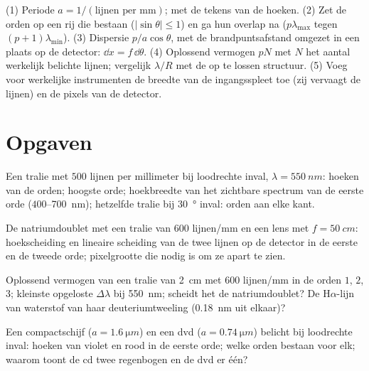 \begin{method}[Tralieberekeningen]\label{met:b2:gratings:method}
(1) Periode $a = 1/(\text{lijnen per mm})$;  met de
tekens van de hoeken. (2) Zet de orden op een rij die bestaan ($|\sin\theta| \le 1$)
en ga hun overlap na ($p\lambda_{\max}$ tegen $(p + 1)\lambda_{\min}$). (3)
Dispersie $p/a\cos\theta$, met de brandpuntsafstand omgezet in een plaats op
de detector:
$\dd x = f\,\dd\theta$. (4) Oplossend vermogen $pN$ met $N$ het aantal
werkelijk belichte lijnen; vergelijk $\lambda/R$ met de op te lossen structuur.
(5) Voeg voor werkelijke instrumenten de breedte van de ingangsspleet toe (zij
vervaagt de lijnen) en de pixels van de detector.
\end{method}

\section{Opgaven}

\begin{exercise}[$\star$]\label{exo:b2:gratings:1}
Een tralie met $500$ lijnen per millimeter bij loodrechte inval,
$\lambda =
\qty{550}{nm}$: hoeken van de orden; hoogste orde; hoekbreedte
van het
zichtbare spectrum van de eerste orde ($400$--\qty{700}{nm}); hetzelfde tralie bij
\qty{30}{\degree} inval: orden aan elke kant.
\end{exercise}

\begin{exercise}[$\star$]\label{exo:b2:gratings:2}
De natriumdoublet met een tralie van $600$ lijnen/mm en een lens met
$f =
\qty{50}{cm}$: hoekscheiding en lineaire scheiding van de twee lijnen
op de
detector in de eerste en de tweede orde; pixelgrootte die nodig is om ze
apart te zien.
\end{exercise}

\begin{exercise}[$\star$]\label{exo:b2:gratings:3}
Oplossend vermogen van een tralie van \qty{2}{cm} met $600$ lijnen/mm in de
orden $1$, $2$,
$3$; kleinste opgeloste $\Delta\lambda$ bij \qty{550}{nm}; scheidt het de
natriumdoublet?
De H$\alpha$-lijn van waterstof van haar deuteriumtweeling (\qty{0.18}{nm}
uit elkaar)?
\end{exercise}

\begin{exercise}[$\star$]\label{exo:b2:gratings:4}
Een compactschijf ($a = \qty{1.6}{\micro m}$) en een dvd
($a = \qty{0.74}{\micro m}$) belicht bij
loodrechte inval: hoeken van violet en rood in de eerste orde; welke orden
bestaan voor elk; waarom toont de cd twee regenbogen en de dvd er één?
\end{exercise}

